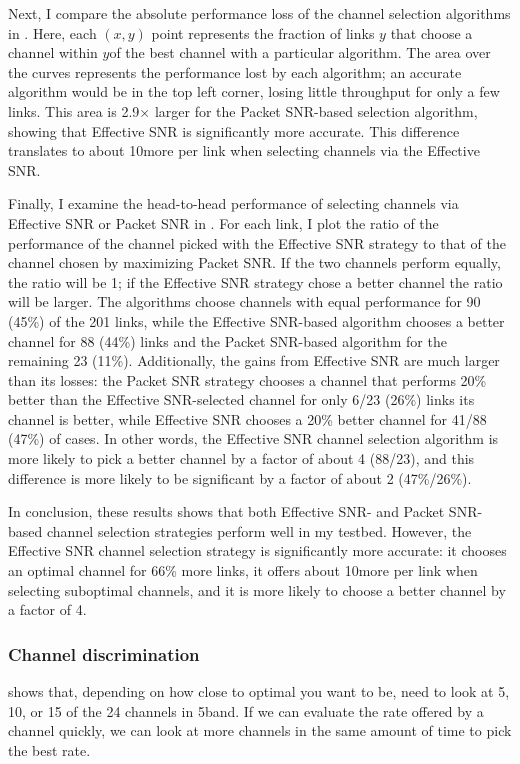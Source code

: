 Next, I compare the absolute performance loss of the channel selection algorithms in . Here, each $(x,y)$ point represents the fraction of links $y$ that choose a channel within $y$\Mbps of the best channel with a particular algorithm. The area over the curves represents the performance lost by each algorithm; an accurate algorithm would be in the top left corner, losing little throughput for only a few links. This area is 2.9$\times$ larger for the Packet SNR-based selection algorithm, showing that Effective SNR is significantly more accurate. This difference translates to about 10\Mbps more per link when selecting channels via the Effective SNR\@.

Finally, I examine the head-to-head performance of selecting channels via Effective SNR or Packet SNR in . For each link, I plot the ratio of the performance of the channel picked with the Effective SNR strategy to that of the channel chosen by maximizing Packet SNR. If the two channels perform equally, the ratio will be 1; if the Effective SNR strategy chose a better channel the ratio will be larger. The algorithms choose channels with equal performance for 90 (45\%) of the 201 links, while the Effective SNR-based algorithm chooses a better channel for 88 (44\%) links and the Packet SNR-based algorithm for the remaining 23 (11\%). Additionally, the gains from Effective SNR are much larger than its losses: the Packet SNR strategy chooses a channel that performs 20\% better than the Effective SNR-selected channel for only 6/23 (26\%) links its channel is better, while Effective SNR chooses a 20\% better channel for 41/88 (47\%) of cases. In other words, the Effective SNR channel selection algorithm is more likely to pick a better channel by a factor of about 4 (88/23), and this difference is more likely to be significant by a factor of about 2 (47\%/26\%).

In conclusion, these results shows that both Effective SNR- and Packet SNR-based channel selection strategies perform well in my testbed. However, the Effective SNR channel selection strategy is significantly more accurate: it chooses an optimal channel for 66\% more links, it offers about 10\Mbps more per link when selecting suboptimal channels, and it is more likely to choose a better channel by a factor of 4.

\subsubsection{Channel discrimination}
  shows that, depending on how close to optimal you want to be, need to look at 5, 10, or 15 of the 24 channels in 5\GHz band. If we can evaluate the rate offered by a channel quickly, we can look at more channels in the same amount of time to pick the best rate.

